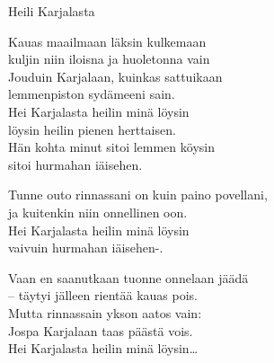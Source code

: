 \begin{song}{Heili Karjalasta}

    Kauas maailmaan läksin kulkemaan\\
    kuljin niin iloisna ja huoletonna vain\\
    Jouduin Karjalaan, kuinkas sattuikaan\\
    lemmenpiston sydämeeni sain.\\
    Hei Karjalasta heilin minä löysin\\
    löysin heilin pienen herttaisen.\\
    Hän kohta minut sitoi lemmen köysin\\
    sitoi hurmahan iäisehen.

    Tunne outo rinnassani on kuin paino povellani,\\
    ja kuitenkin niin onnellinen oon.\\
    Hei Karjalasta heilin minä löysin\\
    vaivuin hurmahan iäisehen-.

    Vaan en saanutkaan tuonne onnelaan jäädä\\
    – täytyi jälleen rientää kauas pois.\\
    Mutta rinnassain ykson aatos vain:\\
    Jospa Karjalaan taas päästä vois.\\
    Hei Karjalasta heilin minä löysin\dots

\end{song}